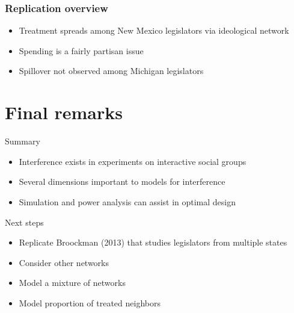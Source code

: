 \documentclass{beamer}
\begin{document}
\begin{frame}
\begin{columns}[c]
\end{columns}
\end{frame}


\begin{frame}
\frametitle{Replication overview}
  \begin{itemize}
 \item
   {\LARGE Treatment spreads among New Mexico legislators via ideological network}
   \vspace{5mm}
  \item
   {\LARGE Spending is a fairly partisan issue}
   \vspace{5mm}
  \item
   {\LARGE Spillover not observed among Michigan legislators}
  \end{itemize}
\end{frame}


\section{Final remarks}

\begin{frame}{Summary}
  \begin{itemize}
 \item
   {\LARGE Interference exists in experiments on interactive social groups}
   \vspace{5mm}
  \item
   {\LARGE Several dimensions important to models for interference}
   \vspace{5mm}
  \item
   {\LARGE Simulation and power analysis can assist in optimal design}
  \end{itemize}
\end{frame}


\begin{frame}{Next steps}
    \begin{itemize}
	\item {\LARGE Replicate Broockman (2013) that studies legislators from multiple states}
	\vspace{5mm}
	\item {\LARGE Consider other networks}
	\vspace{5mm}
	\item {\LARGE Model a mixture of networks}
	\vspace{5mm}
	\item {\LARGE Model proportion of treated neighbors}
    \end{itemize}
\end{frame}
\end{document}
